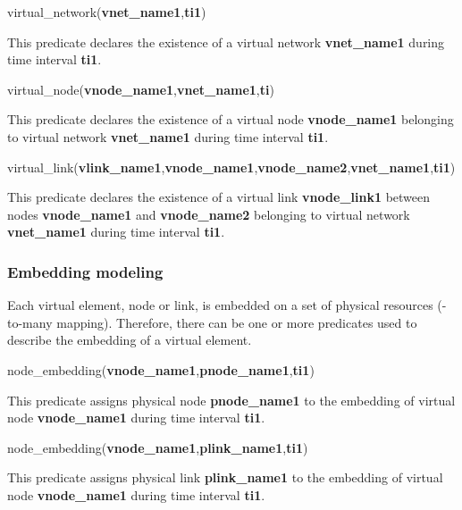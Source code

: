 \begin{myformula}
virtual\_network(\textbf{vnet\_name1},\textbf{ti1})
\end{myformula}

This predicate declares the existence of a virtual network \textbf{vnet\_name1} during time interval \textbf{ti1}.

\begin{myformula}
virtual\_node(\textbf{vnode\_name1},\textbf{vnet\_name1},\textbf{ti})
\end{myformula}

This predicate declares the existence of a virtual node \textbf{vnode\_name1} belonging to virtual network \textbf{vnet\_name1} during time interval \textbf{ti1}.

\begin{myformula}
virtual\_link(\textbf{vlink\_name1},\textbf{vnode\_name1},\textbf{vnode\_name2},\textbf{vnet\_name1},\textbf{ti1})
\end{myformula}

This predicate declares the existence of a virtual link \textbf{vnode\_link1} between nodes \textbf{vnode\_name1} and \textbf{vnode\_name2} belonging to virtual network \textbf{vnet\_name1} during time interval \textbf{ti1}.


\subsubsection{Embedding modeling}
Each virtual element, node or link, is embedded on a set of physical resources (-to-many mapping).
Therefore, there can be one or more predicates used to describe the embedding of a virtual element.

\begin{myformula}
node\_embedding(\textbf{vnode\_name1},\textbf{pnode\_name1},\textbf{ti1})
\end{myformula}

This predicate assigns physical node \textbf{pnode\_name1} to the embedding of virtual node \textbf{vnode\_name1} during time interval \textbf{ti1}.

\begin{myformula}
node\_embedding(\textbf{vnode\_name1},\textbf{plink\_name1},\textbf{ti1})
\end{myformula}

This predicate assigns physical link \textbf{plink\_name1} to the embedding of virtual node \mbox{\textbf{vnode\_name1}} during time interval \textbf{ti1}.

